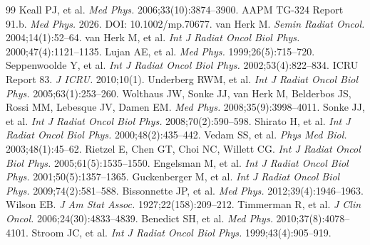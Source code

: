 \documentclass[10pt,twocolumn]{article}
\begin{document}
\begin{thebibliography}{99}
 Keall PJ, et al. \textit{Med Phys.} 2006;33(10):3874--3900.
 AAPM TG-324 Report 91.b. \textit{Med Phys.} 2026. DOI: 10.1002/mp.70677.
 van Herk M. \textit{Semin Radiat Oncol.} 2004;14(1):52--64.
 van Herk M, et al. \textit{Int J Radiat Oncol Biol Phys.} 2000;47(4):1121--1135.
 Lujan AE, et al. \textit{Med Phys.} 1999;26(5):715--720.
 Seppenwoolde Y, et al. \textit{Int J Radiat Oncol Biol Phys.} 2002;53(4):822--834.
 ICRU Report 83. \textit{J ICRU.} 2010;10(1).
 Underberg RWM, et al. \textit{Int J Radiat Oncol Biol Phys.} 2005;63(1):253--260.
 Wolthaus JW, Sonke JJ, van Herk M, Belderbos JS, Rossi MM, Lebesque JV, Damen EM. \textit{Med Phys.} 2008;35(9):3998--4011.
 Sonke JJ, et al. \textit{Int J Radiat Oncol Biol Phys.} 2008;70(2):590--598.
 Shirato H, et al. \textit{Int J Radiat Oncol Biol Phys.} 2000;48(2):435--442.
 Vedam SS, et al. \textit{Phys Med Biol.} 2003;48(1):45--62.
 Rietzel E, Chen GT, Choi NC, Willett CG. \textit{Int J Radiat Oncol Biol Phys.} 2005;61(5):1535--1550.
 Engelsman M, et al. \textit{Int J Radiat Oncol Biol Phys.} 2001;50(5):1357--1365.
 Guckenberger M, et al. \textit{Int J Radiat Oncol Biol Phys.} 2009;74(2):581--588.
 Bissonnette JP, et al. \textit{Med Phys.} 2012;39(4):1946--1963.
 Wilson EB. \textit{J Am Stat Assoc.} 1927;22(158):209--212.
 Timmerman R, et al. \textit{J Clin Oncol.} 2006;24(30):4833--4839.
 Benedict SH, et al. \textit{Med Phys.} 2010;37(8):4078--4101.
 Stroom JC, et al. \textit{Int J Radiat Oncol Biol Phys.} 1999;43(4):905--919.
\end{thebibliography}
\end{document}
